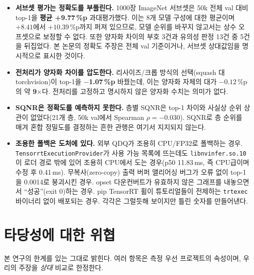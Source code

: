 \documentclass[11pt]{article}
\begin{document}
\begin{itemize}
\item \textbf{서브셋 평가는 정확도를 부풀린다.} 1000장 ImageNet 서브셋은 50k 전체 val 대비 top-1을 \textbf{평균 +9.77\,\%p} 과대평가했다. 이는 8개 모델 구성에 대한 평균이며 $+8.41$에서 $+10.39$\,\%p까지 퍼져 있으므로, 모델 순위를 바꾸지 않고서는 상수 오프셋으로 보정할 수 없다. 또한 양자화 차이의 부호 3건과 유의성 판정 13건 중 5건을 뒤집었다. 본 논문의 정확도 주장은 전체 val 기준이거나, 서브셋 상대값임을 명시적으로 표시한 것이다.
\item \textbf{전처리가 양자화 차이를 압도한다.} 리사이즈/크롭 방식의 선택(squash 대 torchvision)이 top-1을 \textbf{$-$1.07\,\%p} 바꿨는데, 이는 양자화 자체의 대가 $-0.12$\,\%p의 약 \textbf{9$\times$}다. 전처리를 고정하고 명시하지 않은 양자화 수치는 의미가 없다.
\item \textbf{SQNR은 정확도를 예측하지 못한다.} 층별 SQNR은 top-1 차이와 사실상 순위 상관이 없었다(21개 층, 50k val에서 Spearman $\rho = -0.030$). SQNR로 층 순위를 매겨 혼합 정밀도를 결정하는 흔한 관행은 여기서 지지되지 않는다.
\item \textbf{조용한 폴백은 도처에 있다.} 외부 QDQ가 조용히 CPU/FP32로 폴백하는 경우. \texttt{TensorrtExecutionProvider}가 사용 가능 목록에 뜨는데도 \texttt{libnvinfer.so.10}이 로더 경로 밖에 있어 조용히 CPU에서 도는 경우(p50 11.83\,ms, 즉 CPU급이며 수정 후 0.41\,ms). 무복사(zero-copy) 출력 버퍼 앨리어싱 버그가 오류 없이 top-1을 0.0014로 붕괴시킨 경우. opset 다운컨버트가 유효하지 않은 그래프를 내놓으면서 ``성공''(exit 0)하는 경우. pip TensorRT 휠이 튜토리얼들이 전제하는 \texttt{trtexec} 바이너리 없이 배포되는 경우. 각각은 그럴듯해 보이지만 틀린 숫자를 만들어낸다.
\end{itemize}

\section{타당성에 대한 위협}

본 연구의 한계를 있는 그대로 밝힌다. 여러 항목은 측정 우선 프로젝트의 속성이며, 우리의 주장을 \emph{상대} 비교로 한정한다.
\end{document}
